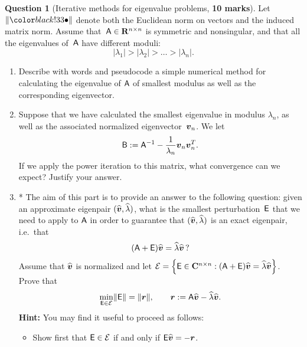 \documentclass[10pt]{article}
\theoremstyle{definition}
\newtheorem{question}{Question}
\theoremstyle{remark}
\theoremstyle{plain}%
\begin{document}
\newpage
\begin{question}
    [Iterative methods for eigenvalue problems, \textbf{10 marks}]
    Let $\norm{\placeholder}$ denote both the Euclidean norm on vectors and the induced matrix norm.
    Assume that~$\mathsf A \in \mathbf R^{n \times n}$ is symmetric and nonsingular,
    and that all the eigenvalues of~$\mathsf A$ have different moduli:
    \[
        \lvert \lambda_1 \rvert
        >
        \lvert \lambda_2 \rvert
        >
        \dots
        >
        \lvert \lambda_n \rvert.
    \]

    \begin{enumerate}
        \item
            Describe with words and pseudocode a simple numerical method for calculating the eigenvalue of $\mathsf A$ of smallest modulus
            as well as the corresponding eigenvector.

        \item
            Suppose that we have calculated the smallest eigenvalue in modulus $\lambda_n$,
            as well as the associated normalized eigenvector~$\mathbf{\boldsymbol{v}}_n$.
            We let
            \[
                \mathsf B := \mathsf A^{-1} - \frac{1}{\lambda_n} \mathbf{\boldsymbol{v}}_n \mathbf{\boldsymbol{v}}_n^T.
            \]
            If we apply the power iteration to this matrix,
            what convergence can we expect?
            Justify your answer.


        \item
            *
            The aim of this part is to provide an answer to the following question:
            given an approximate eigenpair $(\widehat {\mathbf{\boldsymbol{v}}}, \widehat \lambda)$,
            what is the smallest perturbation~$\mathsf E$ that we need to apply to $\mathsf A$ in order to guarantee that
            $(\widehat {\mathbf{\boldsymbol{v}}}, \widehat \lambda)$ is an exact eigenpair, i.e.\ that
            \[
                (\mathsf A + \mathsf E) \widehat {\mathbf{\boldsymbol{v}}} = \widehat \lambda \widehat {\mathbf{\boldsymbol{v}}} \,?
            \]
            Assume that $\widehat {\mathbf{\boldsymbol{v}}}$ is normalized and
            let $\mathcal E = \Bigl\{\mathsf E \in \mathbf C^{n \times n}: (\mathsf A + \mathsf E) \widehat {\mathbf{\boldsymbol{v}}} = \widehat \lambda \widehat {\mathbf{\boldsymbol{v}}} \Bigr\}$.
            Prove that
            \begin{equation}
                \label{eq:kahan_parlett_jiang}
                \min_{\mathsf E \in \mathcal E} \lVert\mathsf E\rVert = \lVert\mathbf{\boldsymbol{r}}\rVert, \qquad \mathbf{\boldsymbol{r}} := \mathsf A \widehat {\mathbf{\boldsymbol{v}}} - \widehat \lambda \widehat {\mathbf{\boldsymbol{v}}}.
            \end{equation}
            \textbf{Hint:} You may find it useful to proceed as follows:
            \begin{itemize}
                \item
                    Show first that $\mathsf E \in \mathcal E$ if and only if $\mathsf E \widehat {\mathbf{\boldsymbol{v}}} = - \mathbf{\boldsymbol{r}}$.


\end{itemize}
\end{enumerate}
\end{question}
\end{document}
